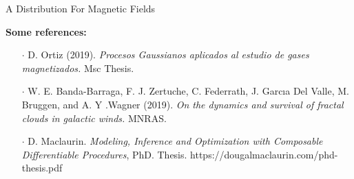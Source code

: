 \documentclass{beamer}
\begin{document}
\begin{frame}{A Distribution For Magnetic Fields}

  \textbf{Some references:}

  \vspace{1em}

  \begin{itemize}
    \item[$\cdot$] D. Ortiz (2019). \emph{Procesos Gaussianos aplicados al estudio de gases magnetizados.} Msc Thesis.
    \item[$\cdot$] W. E. Banda-Barraga, F. J. Zertuche, C. Federrath, J. Garcıa Del Valle, M. Bruggen, and A. Y .Wagner (2019). \emph{On the dynamics and survival of fractal clouds in galactic winds.} MNRAS.
    \item[$\cdot$] D. Maclaurin. \emph{Modeling, Inference and Optimization with Composable Differentiable Procedures}, PhD. Thesis. https://dougalmaclaurin.com/phd-thesis.pdf
  \end{itemize}
\end{frame}
\end{document}

